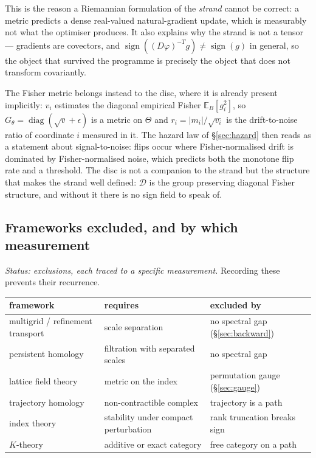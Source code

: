 This is the reason a Riemannian formulation of the \emph{strand} cannot be
correct: a metric predicts a dense real-valued natural-gradient update, which is
measurably not what the optimiser produces. It also explains why the strand is
not a tensor --- gradients are covectors, and
$\operatorname{sign}((D\varphi)^{-T}g)\ne\operatorname{sign}(g)$ in general, so
the object that survived the programme is precisely the object that does not
transform covariantly.

The Fisher metric belongs instead to the disc, where it is already present
implicitly: $v_i$ estimates the diagonal empirical Fisher $\mathbb{E}_B[g_i^2]$,
so $G_\theta=\operatorname{diag}(\sqrt{v}+\epsilon)$ is a metric on $\Theta$
and $r_i=|m_i|/\sqrt{v_i}$ is the drift-to-noise ratio of coordinate $i$
measured in it. The hazard law of \S\ref{sec:hazard} then reads as a statement
about signal-to-noise: flips occur where Fisher-normalised drift is dominated
by Fisher-normalised noise, which predicts both the monotone flip rate and a
threshold. The disc is not a companion to the strand but the structure that
makes the strand well defined: $\mathcal{D}$ is the group preserving diagonal
Fisher structure, and without it there is no sign field to speak of.

\subsection{Frameworks excluded, and by which measurement}
\label{sec:excluded}

\emph{Status: exclusions, each traced to a specific measurement.} Recording
these prevents their recurrence.

\begin{center}
\begin{tabular}{lll}
\hline
framework & requires & excluded by \\
\hline
multigrid / refinement transport & scale separation & no spectral gap (\S\ref{sec:backward}) \\
persistent homology & filtration with separated scales & no spectral gap \\
lattice field theory & metric on the index & permutation gauge (\S\ref{sec:gauge}) \\
trajectory homology & non-contractible complex & trajectory is a path \\
index theory & stability under compact perturbation & rank truncation breaks sign \\
$K$-theory & additive or exact category & free category on a path \\
\hline
\end{tabular}
\end{center}

